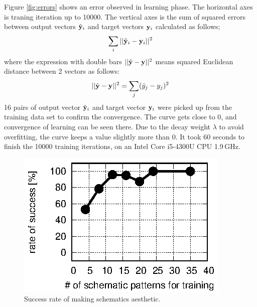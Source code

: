 \documentclass[twocolumn]{article}
\begin{document}
Figure \ref{fig:errors} shows an error observed in learning phase.
The horizontal axes is traning iteration up to 10000.
The vertical axes is the sum of squared errors between
output vectors $\hat{\bf y}_i$ and target vectors ${\bf y}_i$
calculated as follows;
\begin{eqnarray}
\sum_i||\hat{\bf y}_i - {\bf y}_i||^2
\end{eqnarray}
where the expression with double bars $||\hat{\bf y} - {\bf y}||^2$ 
means squared Euclidean distance between 2 vectors as follows:
\begin{eqnarray}
||\hat{\bf y} - {\bf y}||^2 =
\sum_j(\hat{y}_j - y_j)^2
\end{eqnarray}
16 pairs of output vector $\hat{\bf y}_i$ and target vector ${\bf y}_i$
were picked up from the training data set to confirm the convergence.
The curve gets close to 0, and convergence of learning can be seen there.
Due to the decay weight $\lambda$ to avoid overfitting,
the curve keeps a value slightly more than 0.
It took 60 seconds to finish the 10000 training iterations,
on an Intel Core i5-4300U CPU 1.9\,GHz.

\begin{figure}[!tp]
 \begin{center}
  \begin{minipage}{\hsize}
   \includegraphics[width=\hsize]{fig/test_data.eps}
   \caption{Success rate of making schematics aesthetic.}
   \label{fig:test_data}
  \end{minipage}
 \end{center}
\end{figure}
\end{document}
